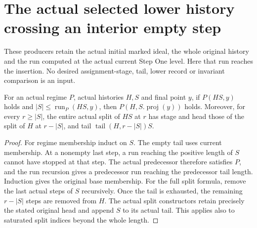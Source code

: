 \section{The actual selected lower history crossing an interior empty step}

These producers retain the actual initial marked ideal, the whole original
history and the run computed at the actual current Step One level.  Here
that run reaches the insertion.  No desired assignment-stage, tail, lower
record or invariant comparison is an input.

\begin{lemma}
\label{hir:original-crossing-run-base-regime}
\leanok
{}
For an actual regime $P$, actual histories $H,S$ and final point $y$, if
$P(HS,y)$ holds and $|S|\leq\operatorname{run}_P(HS,y)$, then
$P(H,S.\operatorname{proj}(y))$ holds.  Moreover, for every $r\geq|S|$, the
entire actual split of $HS$ at $r$ has stage and head those of the split of
$H$ at $r-|S|$, and tail $\operatorname{tail}(H,r-|S|)S$.
\end{lemma}
\begin{proof}
For regime membership induct on $S$.  The empty tail uses current membership.
At a nonempty last step, a run reaching the positive length of $S$ cannot
have stopped at that step.  The actual predecessor therefore satisfies $P$,
and the run recursion gives a predecessor run reaching the predecessor
tail length.  Induction gives the original base membership.  For the full
split formula, remove the last actual steps of $S$ recursively.  Once the
tail is exhausted, the remaining $r-|S|$ steps are removed from $H$.
The actual split constructors retain precisely the stated original head
and append $S$ to its actual tail.  This applies also to saturated split
indices beyond the whole length.
\end{proof}

